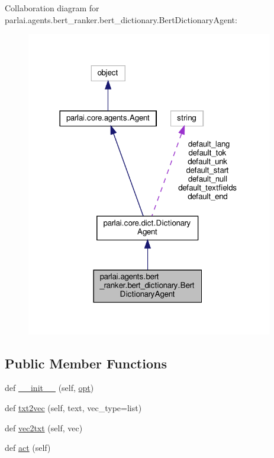 Collaboration diagram for parlai.\+agents.\+bert\+\_\+ranker.\+bert\+\_\+dictionary.\+Bert\+Dictionary\+Agent\+:
\nopagebreak
\begin{figure}[H]
\begin{center}
\leavevmode
\includegraphics[width=305pt]{classparlai_1_1agents_1_1bert__ranker_1_1bert__dictionary_1_1BertDictionaryAgent__coll__graph}
\end{center}
\end{figure}
\subsection*{Public Member Functions}
\begin{DoxyCompactItemize}
\item 
def \hyperlink{classparlai_1_1agents_1_1bert__ranker_1_1bert__dictionary_1_1BertDictionaryAgent_aedf3441c187fc809926e490a9cab9875}{\+\_\+\+\_\+init\+\_\+\+\_\+} (self, \hyperlink{classparlai_1_1core_1_1dict_1_1DictionaryAgent_a6c0d7c9c31b38e99b747be88395d689f}{opt})
\item 
def \hyperlink{classparlai_1_1agents_1_1bert__ranker_1_1bert__dictionary_1_1BertDictionaryAgent_a407dcd1aa927f8065334a825b2d099d9}{txt2vec} (self, text, vec\+\_\+type=list)
\item 
def \hyperlink{classparlai_1_1agents_1_1bert__ranker_1_1bert__dictionary_1_1BertDictionaryAgent_a6269b15dc01bfaac5dd1b5da995f2f0f}{vec2txt} (self, vec)
\item 
def \hyperlink{classparlai_1_1agents_1_1bert__ranker_1_1bert__dictionary_1_1BertDictionaryAgent_a35cefbd011319119e4a395afd6618ac6}{act} (self)
\end{DoxyCompactItemize}
